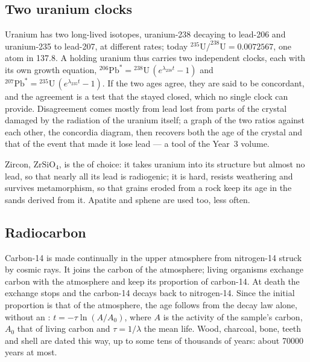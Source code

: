 \subsection*{Two uranium clocks}

Uranium has two long-lived isotopes, uranium-238 decaying to lead-206 and
uranium-235 to lead-207, at different rates; today
$^{235}\mathrm{U}/^{238}\mathrm{U} = 0.0072567$, one atom in 137.8. A 
holding uranium thus carries two independent clocks, each with its own
growth equation, ${}^{206}\mathrm{Pb}^* = {}^{238}\mathrm{U}\,(e^{\lambda_{238} t} - 1)$
and ${}^{207}\mathrm{Pb}^* = {}^{235}\mathrm{U}\,(e^{\lambda_{235} t} - 1)$. If the
two ages agree, they are said to be concordant, and the agreement is a test
that the  stayed closed, which no single clock can provide. Disagreement
comes mostly from lead lost from parts of the crystal damaged by the radiation
of the uranium itself; a graph of the two ratios against each other, the
concordia diagram, then recovers both the age of the crystal and that of the
event that made it lose lead --- a tool of the Year~3 volume.

Zircon, $\mathrm{ZrSiO_4}$, is the  of choice: it takes uranium into its
structure but almost no lead, so that nearly all its lead is radiogenic; it is
hard, resists weathering and survives metamorphism, so that grains eroded from
a rock keep its age in the sands derived from it. Apatite and sphene are used
too, less often.

\subsection*{Radiocarbon}

Carbon-14 is made continually in the upper atmosphere from nitrogen-14 struck
by cosmic rays. It joins the carbon of the atmosphere; living organisms
exchange carbon with the atmosphere and keep its proportion of carbon-14. At
death the exchange stops and the carbon-14 decays back to nitrogen-14. Since the
initial proportion is that of the atmosphere, the age follows from the decay
law alone, without an : $t = -\tau \ln(A/A_0)$, where $A$ is the
activity of the sample's carbon, $A_0$ that of living carbon and $\tau =
1/\lambda$ the mean life. Wood, charcoal, bone, teeth and shell are dated this
way, up to some tens of thousands of years: about \num{70000} years at most.

